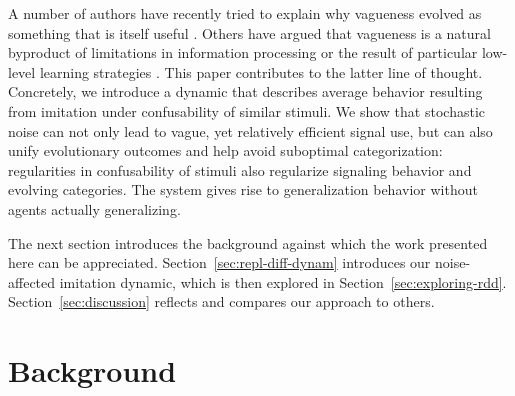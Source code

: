 \documentclass[fleqn,reqno,10pt]{article}
\begin{document}
A number of authors have recently tried to explain why vagueness evolved as something that is
itself useful
\citep[e.g.][]{Jaegherde-Jaegher2003:A-Game-Theoreti,Deemter2009:Utility-and-Lan,BlumeBoard2013:Intentional-Vag}.
Others have argued that vagueness is a natural byproduct of limitations in information
processing \citep[e.g.][]{FrankeJager2010:Vagueness-Signa} or the result of particular
low-level learning strategies \citep[e.g.][]{OConnor2013:The-Evolution-o}. This paper
contributes to the latter line of thought. Concretely, we introduce a dynamic that describes
average behavior resulting from imitation under confusability of similar stimuli. We show that
stochastic noise can not only lead to vague, yet relatively efficient signal use, but can also
unify evolutionary outcomes and help avoid suboptimal categorization: regularities in
confusability of stimuli also regularize signaling behavior and evolving categories. The system
gives rise to generalization behavior without agents actually generalizing.

The next section introduces the background against which the work presented here can be
appreciated. Section~\ref{sec:repl-diff-dynam} introduces our noise-affected imitation dynamic,
which is then explored in Section~\ref{sec:exploring-rdd}.  Section~\ref{sec:discussion}
reflects and compares our approach to others. %

\section{Background}
\label{sec:background}

\end{document}
